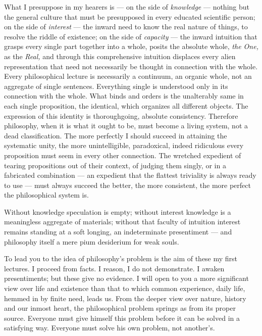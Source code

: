 \documentclass[12pt,a4paper,openany]{book}
\newcommand{\opage}[1]{\marginnote{\footnotesize\textit{[#1]}}}
\begin{document}
What I presuppose in my hearers is --- on the side of \textit{knowledge} ---
nothing but the general culture that must be presupposed in every educated
scientific person; on the side of \textit{interest} --- the inward need to
\setcounter{footnote}{0}%
\opage{46}know the real nature of things, to resolve the riddle of existence; on the
side of \textit{capacity} --- the inward intuition that grasps every single part
together into a whole, posits the absolute whole, \textit{the One,} as the
\textit{Real,} and through this comprehensive intuition displaces every alien
representation that need not necessarily be thought in connection with the whole.
Every philosophical lecture is necessarily a continuum, an organic whole, not an
aggregate of single sentences. Everything single is understood only in its
connection with the whole. What binds and orders is the unalterably same in each
single proposition, the identical, which organizes all different objects. The
expression of this identity is thoroughgoing, absolute consistency. Therefore
philosophy, when it is what it ought to be, must become a living system, not a dead
classification. The more perfectly I should succeed in attaining the systematic
unity, the more unintelligible, paradoxical, indeed ridiculous every proposition
must seem in every other connection. The wretched expedient of tearing propositions
out of their context, of judging them singly, or in a fabricated combination ---
an expedient that the flattest triviality is always ready to use --- must always
succeed the better, the more consistent, the more perfect the philosophical system
is.

Without knowledge speculation is empty; without interest knowledge is a meaningless
aggregate of materials; without that faculty of intuition interest remains standing
at a soft longing, an indeterminate presentiment --- and philosophy itself a mere
pium desiderium for weak souls.

To lead you to the idea of philosophy's problem is the aim of these my first
lectures. I proceed from facts. I reason, I do not demonstrate. I awaken
presentiments; but these give no evidence. I will open to you a more significant
view over life and existence than that to which common experience, daily life,
hemmed in by finite need, leads us. From the deeper view over nature,
\setcounter{footnote}{0}%
\opage{47}history and our inmost heart, the philosophical problem springs as from its
proper source. Everyone must give himself this problem before it can be solved in a
satisfying way. Everyone must solve his own problem, not another's.
\end{document}

